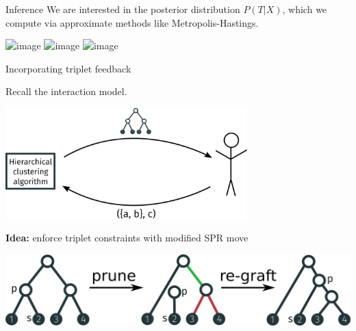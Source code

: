 \documentclass[10pt, compress]{beamer}
\begin{document}
\begin{frame}{Inference}
  We are interested in the posterior distribution
  $P(T | X)$, which we compute
  via approximate methods like Metropolis-Hastings.


  \begin{center}
    \includegraphics<3>[width=\textwidth]{img/spr-1}
    \includegraphics<4>[width=\textwidth]{img/spr-2}
    \includegraphics<5->[width=\textwidth]{img/spr-3}
  \end{center}


\end{frame}

\begin{frame}{Incorporating triplet feedback}

  Recall the interaction model.

  \begin{center}
    \includegraphics[width=0.7\textwidth]{img/interaction-3}
  \end{center}
  \pause

  \textbf{Idea:}  enforce triplet constraints with
  modified SPR move

  \pause

  \begin{center}
    \includegraphics[width=\textwidth]{img/cspr-animation}
  \end{center}
\end{frame}
\end{document}
